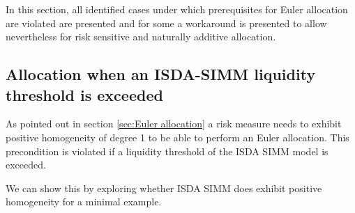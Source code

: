 \documentclass[../Thesis_AHoecherl.tex]{subfiles}
\begin{document}
    In this section, all identified cases under which prerequisites for Euler allocation are violated are presented and for some a workaround is presented to allow nevertheless for risk sensitive and naturally additive allocation.
    
    \subsection{Allocation when an ISDA-SIMM liquidity threshold is exceeded\label{sec:Allocation when an ISDA-SIMM liquidity threshold is exceeded}}
    
    As pointed out in section \ref{sec:Euler allocation} a risk measure needs to exhibit positive homogeneity of degree 1 to be able to perform an Euler allocation.
    This precondition is violated if a liquidity threshold of the ISDA SIMM model is exceeded.

    We can show this by exploring whether ISDA SIMM does exhibit positive homogeneity for a minimal example.
    
\end{document}
